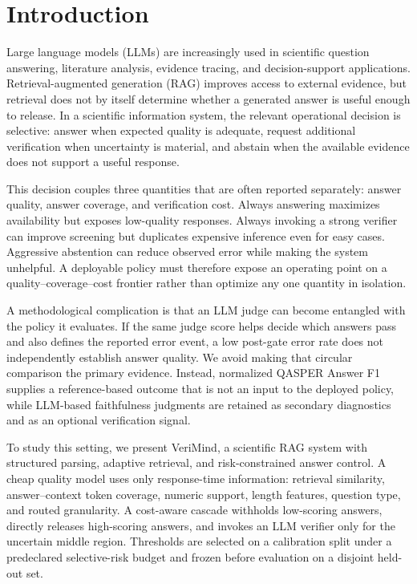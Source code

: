 \documentclass[smallextended]{svjour3}
\begin{document}
\section{Introduction}
\label{sec:introduction}

Large language models (LLMs) are increasingly used in scientific question answering, literature analysis, evidence tracing, and decision-support applications. Retrieval-augmented generation (RAG) improves access to external evidence, but retrieval does not by itself determine whether a generated answer is useful enough to release. In a scientific information system, the relevant operational decision is selective: answer when expected quality is adequate, request additional verification when uncertainty is material, and abstain when the available evidence does not support a useful response.

This decision couples three quantities that are often reported separately: answer quality, answer coverage, and verification cost. Always answering maximizes availability but exposes low-quality responses. Always invoking a strong verifier can improve screening but duplicates expensive inference even for easy cases. Aggressive abstention can reduce observed error while making the system unhelpful. A deployable policy must therefore expose an operating point on a quality--coverage--cost frontier rather than optimize any one quantity in isolation.

A methodological complication is that an LLM judge can become entangled with the policy it evaluates. If the same judge score helps decide which answers pass and also defines the reported error event, a low post-gate error rate does not independently establish answer quality. We avoid making that circular comparison the primary evidence. Instead, normalized QASPER Answer F1 supplies a reference-based outcome that is not an input to the deployed policy, while LLM-based faithfulness judgments are retained as secondary diagnostics and as an optional verification signal.

To study this setting, we present VeriMind, a scientific RAG system with structured parsing, adaptive retrieval, and risk-constrained answer control. A cheap quality model uses only response-time information: retrieval similarity, answer--context token coverage, numeric support, length features, question type, and routed granularity. A cost-aware cascade withholds low-scoring answers, directly releases high-scoring answers, and invokes an LLM verifier only for the uncertain middle region. Thresholds are selected on a calibration split under a predeclared selective-risk budget and frozen before evaluation on a disjoint held-out set.
\end{document}
